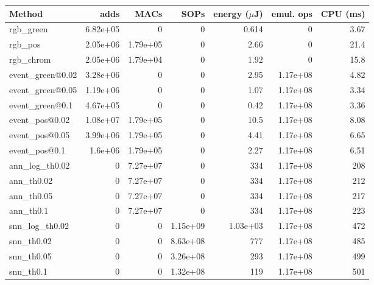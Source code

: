 \begin{tabular}{lrrrrrr}\toprule
Method & adds & MACs & SOPs & energy ($\mu$J) & emul. ops & CPU (ms) \\\midrule
rgb\_green & 6.82e+05 & 0 & 0 & 0.614 & 0 & 3.67 \\
rgb\_pos & 2.05e+06 & 1.79e+05 & 0 & 2.66 & 0 & 21.4 \\
rgb\_chrom & 2.05e+06 & 1.79e+04 & 0 & 1.92 & 0 & 15.8 \\
event\_green@0.02 & 3.28e+06 & 0 & 0 & 2.95 & 1.17e+08 & 4.82 \\
event\_green@0.05 & 1.19e+06 & 0 & 0 & 1.07 & 1.17e+08 & 3.34 \\
event\_green@0.1 & 4.67e+05 & 0 & 0 & 0.42 & 1.17e+08 & 3.36 \\
event\_pos@0.02 & 1.08e+07 & 1.79e+05 & 0 & 10.5 & 1.17e+08 & 8.08 \\
event\_pos@0.05 & 3.99e+06 & 1.79e+05 & 0 & 4.41 & 1.17e+08 & 6.65 \\
event\_pos@0.1 & 1.6e+06 & 1.79e+05 & 0 & 2.27 & 1.17e+08 & 6.51 \\
ann\_log\_th0.02 & 0 & 7.27e+07 & 0 & 334 & 1.17e+08 & 208 \\
ann\_th0.02 & 0 & 7.27e+07 & 0 & 334 & 1.17e+08 & 212 \\
ann\_th0.05 & 0 & 7.27e+07 & 0 & 334 & 1.17e+08 & 217 \\
ann\_th0.1 & 0 & 7.27e+07 & 0 & 334 & 1.17e+08 & 223 \\
snn\_log\_th0.02 & 0 & 0 & 1.15e+09 & 1.03e+03 & 1.17e+08 & 472 \\
snn\_th0.02 & 0 & 0 & 8.63e+08 & 777 & 1.17e+08 & 485 \\
snn\_th0.05 & 0 & 0 & 3.26e+08 & 293 & 1.17e+08 & 499 \\
snn\_th0.1 & 0 & 0 & 1.32e+08 & 119 & 1.17e+08 & 501 \\
\bottomrule\end{tabular}
